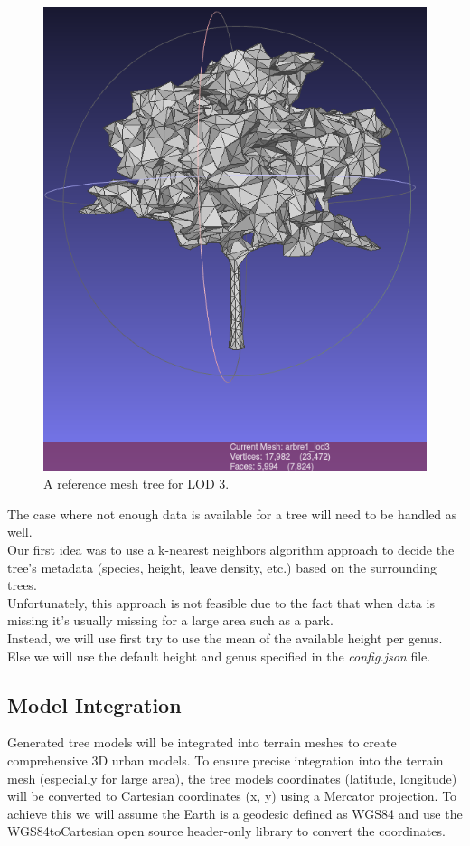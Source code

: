 \documentclass[12pt]{article}
\begin{document}
\begin{figure}[H]
\begin{minipage}{0.45\textwidth}
        \includegraphics[width=\textwidth]{images/lod3.png}
        \caption{A reference mesh tree for LOD 3.}
    \end{minipage}
\end{figure}

The case where not enough data is available for a tree will need to be handled
as well. \\
Our first idea was to use a k-nearest neighbors algorithm \cite{k-NN} approach to
decide the tree's metadata (species, height, leave density, etc.) based on the
surrounding trees. \\
Unfortunately, this approach is not feasible due to the fact that
when data is missing it's usually missing for a large area such as a park. \\
Instead, we will use first try to use the mean of the available height per genus. \\
Else we will use the default height and genus specified in the \textit{config.json} file.

\subsection{Model Integration}
Generated tree models will be integrated into terrain meshes to create comprehensive
3D urban models. To ensure precise integration into the terrain mesh (especially for large area), the tree models coordinates
(latitude, longitude) will be converted to Cartesian coordinates (x, y) using
a Mercator projection\cite{mercator-proj}. To achieve this we will assume the Earth is a geodesic
defined as WGS84 \cite{wgs84} and use the WGS84toCartesian\cite{wgs84_to_cartesian} open source header-only
  library to convert the coordinates.
\end{document}
